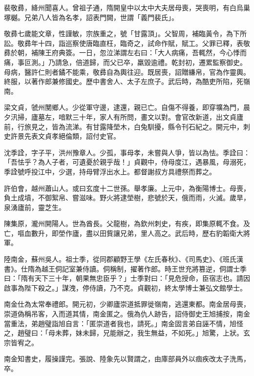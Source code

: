 \begin{pinyinscope}
 裴敬彞，絳州聞喜人。曾祖子通，隋開皇中以太中大夫居母喪，哭喪明，有白烏巢塚樾。兄弟八人皆為名孝，詔表門闕，世謂「義門裴氏」。



 敬彞七歲能文章，性謹敏，宗族重之，號「甘露頂」。父智周，補臨黃令，為下所訟。敬彞年十四，詣巡察使唐臨直枉，臨奇之，試命作賦，賦工。父罪已釋，表敬彞於朝，補陳王府典簽。一日，忽泣涕謂左右曰：「大人病痛，吾輒然，今心悸而痛，事叵測。」乃請急，倍道歸，而父已卒，羸毀逾禮。乾封初，遷累監察御史。母病，醫許仁則者鐍不能乘，敬彞自為輿往迎。既居喪，詔贈縑帛，官為作靈輿。終服，以著作郎兼修國史。歷中書舍人、太子左庶子。武后時，為酷吏所陷，死嶺南。



 梁文貞，虢州閺鄉人。少從軍守邊，逮還，親已亡。自傷不得養，即穿壙為門，晨夕汛掃，廬墓左，喑默三十年，家人有所問，畫文以對。會官改新道，出文貞廬前，行旅見之，皆為流涕。有甘露降塋木，白兔馴擾，縣令刊石紀之。開元中，刺史許景先表文貞孝絕倫類，詔付史官。



 沈季詮，字子平，洪州豫章人。少孤，事母孝，未嘗與人爭，皆以為怯。季詮曰：「吾怯乎？為人子者，可遺憂於親乎哉！」貞觀中，侍母度江，遇暴風，母溺死，季詮號呼投江中，少選，持母臂浮出水上。都督謝叔方具禮祭而葬之。



 許伯會，越州蕭山人。或曰玄度十二世孫。舉孝廉。上元中，為衡陽博士。母喪，負土成墳，不御絮帛、嘗滋味。野火將逮塋樹，悲號於天，俄而雨，火滅。歲旱，泉湧廬前，靈芝生。



 陳集原，瀧州開陽人。世為酋長。父龍樹，為欽州刺史，有疾，即集原輒不食。及亡，嘔血數升，即塋作廬，盡以田貲讓兄弟，里人高之。武后時，歷右豹韜衛大將軍。



 陸南金，蘇州吳人。祖士季，從同郡顧野王學《左氏春秋》、《司馬史》、《班氏漢書》。仕隋為越王侗記室兼侍讀。侗稱制，擢著作郎。時王世充將篡逆，侗謂士季曰：「隋有天下三十年，朝果無忠臣乎？」士季對曰：「見危授命，臣宿志也。請因啟事為陛下殺之。」謀洩，停侍讀，乃不克。貞觀初，終太學博士兼弘文館學士。



 南金仕為太常奉禮郎。開元初，少卿廬崇道抵罪徙嶺南，逃還東都。南金居母喪，崇道偽稱吊客，入而道其情，南金匿之。俄為仇人跡告，詔侍御史王旭捕按，南金當重法，弟趙璧詣旭自言：「匿崇道者我也，請死。」南金固言弟自誣不情，旭怪之，趙璧曰：「母未葬，妹未歸，兄能辦之，我生無益，不如死。」旭驚，上狀。玄宗皆宥之。



 南金知書史，履操謹完。張說、陸象先以賢謂之，由庫部員外以痼疾改太子洗馬，卒。




\end{pinyinscope}
